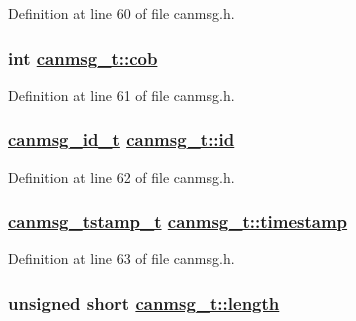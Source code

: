 Definition at line 60 of file canmsg.h.\hypertarget{structcanmsg__t_2a9a1988755a4f92d5706f02cf5001f9}{
\subsubsection[cob]{\setlength{\rightskip}{0pt plus 5cm}int \hyperlink{structcanmsg__t_2a9a1988755a4f92d5706f02cf5001f9}{canmsg\_\-t::cob}}}
\label{structcanmsg__t_2a9a1988755a4f92d5706f02cf5001f9}




Definition at line 61 of file canmsg.h.\hypertarget{structcanmsg__t_9ca617a401250c914820ae4ed2768725}{
\subsubsection[id]{\setlength{\rightskip}{0pt plus 5cm}\hyperlink{canmsg_8h_4df2eff676652dbe67d372e42ccf8aa7}{canmsg\_\-id\_\-t} \hyperlink{structcanmsg__t_9ca617a401250c914820ae4ed2768725}{canmsg\_\-t::id}}}
\label{structcanmsg__t_9ca617a401250c914820ae4ed2768725}




Definition at line 62 of file canmsg.h.\hypertarget{structcanmsg__t_11568aa34f1851a87de25f6f0d6bbf8f}{
\subsubsection[timestamp]{\setlength{\rightskip}{0pt plus 5cm}\hyperlink{canmsg_8h_f5a9ea1b33e64787190dccc1ce5419a2}{canmsg\_\-tstamp\_\-t} \hyperlink{structcanmsg__t_11568aa34f1851a87de25f6f0d6bbf8f}{canmsg\_\-t::timestamp}}}
\label{structcanmsg__t_11568aa34f1851a87de25f6f0d6bbf8f}




Definition at line 63 of file canmsg.h.\hypertarget{structcanmsg__t_9b2006e54552e02778eea1da3ac52070}{
\subsubsection[length]{\setlength{\rightskip}{0pt plus 5cm}unsigned short \hyperlink{structcanmsg__t_9b2006e54552e02778eea1da3ac52070}{canmsg\_\-t::length}}}
\label{structcanmsg__t_9b2006e54552e02778eea1da3ac52070}




